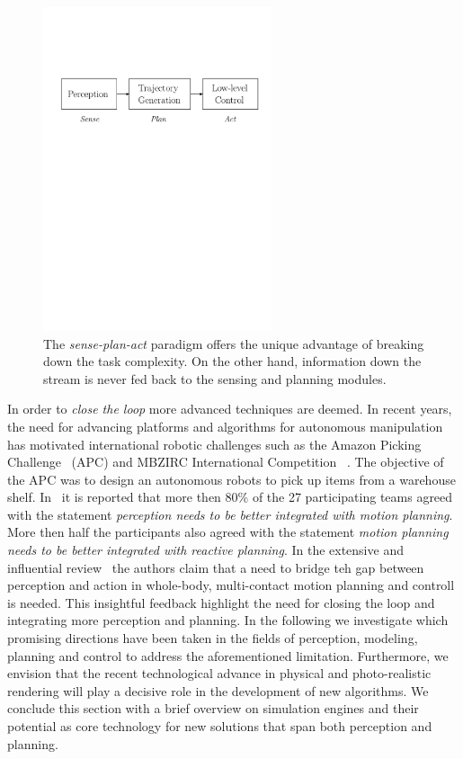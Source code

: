 \begin{figure}[h!]
    \centering
    \includegraphics[width=0.6\textwidth]{images/sense_plan_act.pdf}
    \caption{The \emph{sense-plan-act} paradigm offers the unique advantage of breaking down the task complexity. On the other hand, information down the stream is never fed back to the sensing and planning modules.}
    \label{fig:sense_plan_act}
\end{figure}

In order to \emph{close the loop} more advanced techniques are deemed. In recent years, the need for advancing platforms and  
algorithms for autonomous manipulation has motivated international robotic challenges such as the Amazon Picking Challenge~\cite{correll2016analysis} (APC) and MBZIRC International Competition ~\cite{baca2020autonomous}. The objective of the APC was to design an autonomous robots to pick up items from a warehouse shelf. In~\cite{cooper2020ari} it is reported that more then 80\% of the 27 participating teams agreed with the statement \emph{perception needs to be better integrated with motion planning}. More then half the participants also agreed with the statement \emph{motion planning needs to be better integrated with reactive planning}. In the extensive and influential review~\cite{bohg2017interactive} the authors claim that a need to bridge teh gap between perception and action in whole-body, multi-contact motion planning and controll is needed. This insightful feedback highlight the need for closing the loop and integrating more perception and planning. In the following we investigate which promising directions have been taken in the fields of perception, modeling, planning and control to address the aforementioned limitation. Furthermore, we envision that the recent technological advance in physical and photo-realistic rendering will play a decisive role in the development of new algorithms. We conclude this section with a brief overview on simulation engines and their potential as core technology for new solutions that span both perception and planning. 

